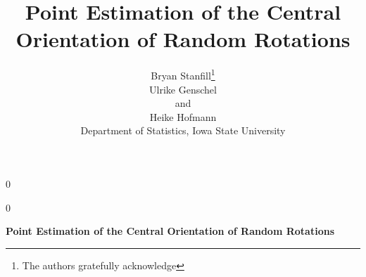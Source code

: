 \documentclass[12pt]{article}
\newcommand{\blind}{0}
\begin{document}
\def\spacingset#1{\renewcommand{\baselinestretch}%
{#1}\small\normalsize} \spacingset{1}

\blind
{
  \title{\bf Point Estimation of the Central Orientation of Random Rotations}
  \author{Bryan Stanfill\thanks{
    The authors gratefully acknowledge}\hspace{.2cm}\\
    Ulrike Genschel \\
    and\\
    Heike Hofmann\\
    Department of Statistics, Iowa State University\\}
  \maketitle
} \fi

\blind
{
  \bigskip
  \bigskip
  \bigskip
  \begin{center}
    {\LARGE\bf Point Estimation of the Central Orientation of Random Rotations}
\end{center}
  \medskip
} \fi

\end{document}
